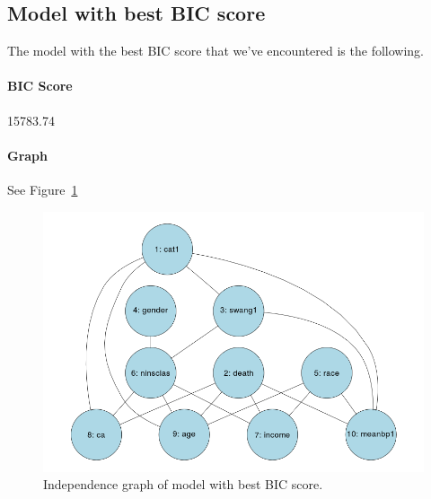 \documentclass[12pt]{article}
\theoremstyle{definition}
\begin{document}
\subsection*{Model with best BIC score}
The model with the best BIC score that we've encountered is the following.

\paragraph{BIC Score} 15783.74

\paragraph{Graph} See Figure~\ref{fig:bic_best}

\begin{figure}[H]
    \centering
    \includegraphics[width=0.8\linewidth]{bic_best.png}
    \caption{Independence graph of model with best BIC score.}
\label{fig:bic_best}
\end{figure}
\end{document}

